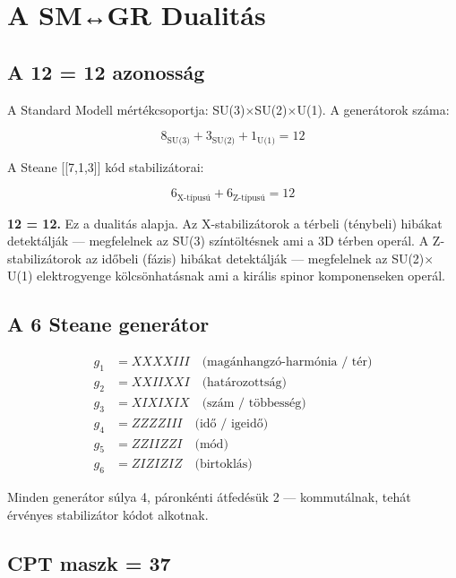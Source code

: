 \documentclass[11pt,a4paper,twoside]{book}
\begin{document}
\chapter{A SM↔GR Dualitás}

\section{A 12 = 12 azonosság}

A Standard Modell mértékcsoportja: SU(3)$\times$SU(2)$\times$U(1). A generátorok száma:

\begin{equation}
8_{\text{SU(3)}} + 3_{\text{SU(2)}} + 1_{\text{U(1)}} = 12
\end{equation}

A Steane [[7,1,3]] kód stabilizátorai:

\begin{equation}
6_{\text{X-típusú}} + 6_{\text{Z-típusú}} = 12
\end{equation}

\textbf{12 = 12.} Ez a dualitás alapja. Az X-stabilizátorok a térbeli (ténybeli) hibákat detektálják — megfelelnek az SU(3) színtöltésnek ami a 3D térben operál. A Z-stabilizátorok az időbeli (fázis) hibákat detektálják — megfelelnek az SU(2)$\times$U(1) elektrogyenge kölcsönhatásnak ami a királis spinor komponenseken operál.

\section{A 6 Steane generátor}

\begin{align}
g_1 &= XXXXIII \quad \text{(magánhangzó-harmónia / tér)}\\
g_2 &= XXIIXXI \quad \text{(határozottság)}\\
g_3 &= XIXIXIX \quad \text{(szám / többesség)}\\
g_4 &= ZZZZIII \quad \text{(idő / igeidő)}\\
g_5 &= ZZIIZZI \quad \text{(mód)}\\
g_6 &= ZIZIZIZ \quad \text{(birtoklás)}
\end{align}

Minden generátor súlya 4, páronkénti átfedésük 2 — kommutálnak, tehát érvényes stabilizátor kódot alkotnak.

\section{CPT maszk = 37}
\end{document}
